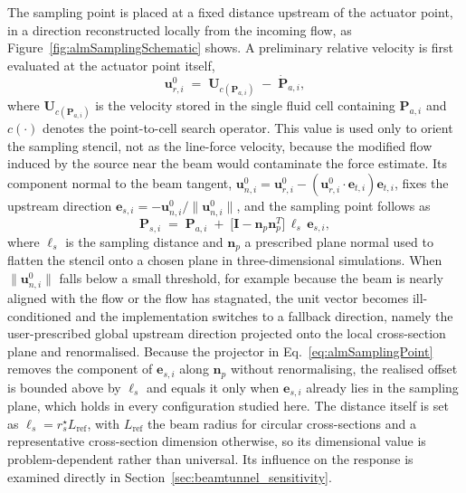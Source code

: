 \noindent
The sampling point is placed at a fixed distance upstream of the actuator point, in a direction reconstructed locally from the incoming flow, as Figure~\ref{fig:almSamplingSchematic} shows. A preliminary relative velocity is first evaluated at the actuator point itself,
\begin{equation}
\mathbf{u}^{0}_{r,i}
\;=\;
\mathbf{U}_{c(\mathbf{P}_{a,i})}
\;-\;
\dot{\mathbf{P}}_{a,i},
\label{eq:almPreliminaryVelocity}
\end{equation}
where $\mathbf{U}_{c(\mathbf{P}_{a,i})}$ is the velocity stored in the single fluid cell containing $\mathbf{P}_{a,i}$ and $c(\cdot)$ denotes the point-to-cell search operator. This value is used only to orient the sampling stencil, not as the line-force velocity, because the modified flow induced by the source near the beam would contaminate the force estimate. Its component normal to the beam tangent, $\mathbf{u}^{0}_{n,i} = \mathbf{u}^{0}_{r,i} - (\mathbf{u}^{0}_{r,i}\!\cdot\!\mathbf{e}_{t,i})\mathbf{e}_{t,i}$, fixes the upstream direction $\mathbf{e}_{s,i} = -\mathbf{u}^{0}_{n,i}/\lVert\mathbf{u}^{0}_{n,i}\rVert$, and the sampling point follows as
\begin{equation}
\mathbf{P}_{s,i}
\;=\;
\mathbf{P}_{a,i}
\;+\;
\bigl[\mathbf{I} - \mathbf{n}_{p}\mathbf{n}_{p}^{T}\bigr]\,\ell_{s}\,\mathbf{e}_{s,i},
\label{eq:almSamplingPoint}
\end{equation}
where $\ell_{s}$ is the sampling distance and $\mathbf{n}_{p}$ a prescribed plane normal used to flatten the stencil onto a chosen plane in three-dimensional simulations. When $\lVert\mathbf{u}^{0}_{n,i}\rVert$ falls below a small threshold, for example because the beam is nearly aligned with the flow or the flow has stagnated, the unit vector becomes ill-conditioned and the implementation switches to a fallback direction, namely the user-prescribed global upstream direction projected onto the local cross-section plane and renormalised. Because the projector in Eq.~\eqref{eq:almSamplingPoint} removes the component of $\mathbf{e}_{s,i}$ along $\mathbf{n}_{p}$ without renormalising, the realised offset is bounded above by $\ell_{s}$ and equals it only when $\mathbf{e}_{s,i}$ already lies in the sampling plane, which holds in every configuration studied here. The distance itself is set as $\ell_{s} = r_{s}^{\star}L_{\mathrm{ref}}$, with $L_{\mathrm{ref}}$ the beam radius for circular cross-sections and a representative cross-section dimension otherwise, so its dimensional value is problem-dependent rather than universal. Its influence on the response is examined directly in Section~\ref{sec:beamtunnel_sensitivity}.

